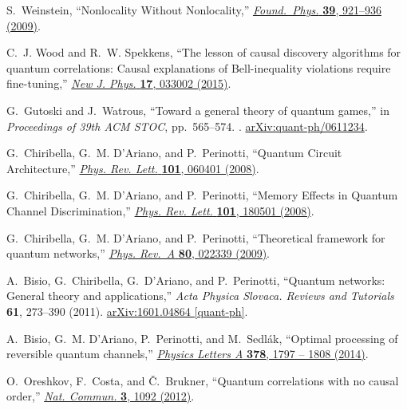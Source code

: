 \documentclass[a4paper,onecolumn,11pt,accepted=2018-05-04]{quantumarticle}
\begin{document}
\begin{thebibliography}{10}
S.~Weinstein, ``Nonlocality Without Nonlocality,''
  \href{http://dx.doi.org/10.1007/s10701-009-9305-x}{{\em  Found.\ Phys.} {\bfseries 39}, 921--936 (2009)}.

C.~J. Wood and R.~W. Spekkens, ``The lesson of causal discovery algorithms for
  quantum correlations: {Causal} explanations of {Bell}-inequality violations
  require fine-tuning,''
  \href{http://dx.doi.org/10.1088/1367-2630/17/3/033002}{{\em New J. Phys.}
  {\bfseries 17}, 033002 (2015)}.

G.~Gutoski and J.~Watrous, ``Toward a general theory of quantum games,'' in
  {\em Proceedings of 39th ACM STOC}, pp.~565--574.
.
\newblock \href{http://arxiv.org/abs/quant-ph/0611234}{{\ttfamily
  arXiv:quant-ph/0611234}}.

G.~Chiribella, G.~M. D'Ariano, and P.~Perinotti, ``Quantum Circuit
  Architecture,'' \href{http://dx.doi.org/10.1103/PhysRevLett.101.060401}{{\em
  Phys. Rev. Lett.} {\bfseries 101}, 060401 (2008)}.

G.~Chiribella, G.~M. D'Ariano, and P.~Perinotti, ``Memory Effects in Quantum
  Channel Discrimination,''
  \href{http://dx.doi.org/10.1103/PhysRevLett.101.180501}{{\em Phys. Rev.
  Lett.} {\bfseries 101}, 180501 (2008)}.

G.~{Chiribella}, G.~M. {D'Ariano}, and P.~{Perinotti}, ``{Theoretical framework
  for quantum networks},''
  \href{http://dx.doi.org/10.1103/PhysRevA.80.022339}{{\em Phys. Rev.~A}
  {\bfseries 80}, 022339 (2009)}.

A.~Bisio, G.~Chiribella, G.~D'Ariano, and P.~Perinotti, ``Quantum networks:
  {General} theory and applications,''
  {\em
  Acta Physica Slovaca. Reviews and Tutorials} {\bfseries 61}, 273--390
  (2011). \href{https://arxiv.org/abs/1601.04864}{{\ttfamily  	arXiv:1601.04864 [quant-ph]}}.

A.~Bisio, G.~M. D'Ariano, P.~Perinotti, and M.~Sedlák, ``Optimal processing of
  reversible quantum channels,''
  \href{http://dx.doi.org/10.1016/j.physleta.2014.04.042}{{\em Physics Letters
  A} {\bfseries 378}, 1797 -- 1808 (2014)}.

O.~{Oreshkov}, F.~{Costa}, and {\v C}.~{Brukner}, ``{Quantum correlations with
  no causal order},'' \href{http://dx.doi.org/10.1038/ncomms2076}{{\em Nat.
  Commun.} {\bfseries 3}, 1092 (2012)}.


\end{thebibliography}
\end{document}

